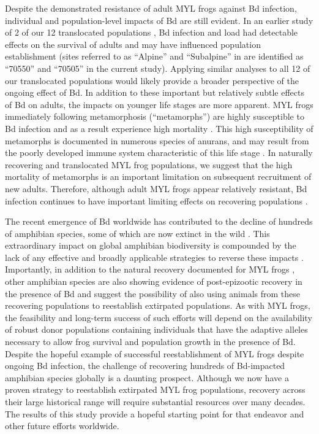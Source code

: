 \documentclass[9pt,twocolumn,twoside,lineno]{pnas-new}
\begin{document}
Despite the demonstrated resistance of adult MYL frogs against Bd
infection, individual and population-level impacts of Bd are still
evident. In an earlier study of 2 of our 12 translocated populations
\citep{joseph2018}, Bd infection and load had detectable effects on the
survival of adults and may have influenced population establishment
(sites referred to as ``Alpine'' and ``Subalpine'' in \citep{joseph2018}
are identified as ``70550'' and ``70505'' in the current study).
Applying similar analyses to all 12 of our translocated populations
would likely provide a broader perspective of the ongoing effect of Bd.
In addition to these important but relatively subtle effects of Bd on
adults, the impacts on younger life stages are more apparent. MYL frogs
immediately following metamorphosis (``metamorphs'') are highly
susceptible to Bd infection \citep{ellison2019} and as a result
experience high mortality \citep{rachowicz2006}. This high
susceptibility of metamorphs is documented in numerous species of
anurans, and may result from the poorly developed immune system
characteristic of this life stage \citep{humphries2022}. In naturally
recovering and translocated MYL frog populations, we suggest that the
high mortality of metamorphs is an important limitation on subsequent
recruitment of new adults. Therefore, although adult MYL frogs appear
relatively resistant, Bd infection continues to have important limiting
effects on recovering populations \citep[see also][]{hollanders2022}.

The recent emergence of Bd worldwide has contributed to the decline of
hundreds of amphibian species, some of which are now extinct in the wild
\citep{scheele2019}. This extraordinary impact on global amphibian
biodiversity is compounded by the lack of any effective and broadly
applicable strategies to reverse these impacts
\citep{garner2016, knapp2022}. Importantly, in addition to the natural
recovery documented for MYL frogs \citep{knapp2016}, other amphibian
species are also showing evidence of post-epizootic recovery in the
presence of Bd \citep{scheele2017, voyles2018} and suggest the
possibility of also using animals from these recovering populations to
reestablish extirpated populations. As with MYL frogs, the feasibility
and long-term success of such efforts will depend on the availability of
robust donor populations containing individuals that have the adaptive
alleles necessary to allow frog survival and population growth in the
presence of Bd. Despite the hopeful example of successful
reestablishment of MYL frogs despite ongoing Bd infection, the challenge
of recovering hundreds of Bd-impacted amphibian species globally is a
daunting prospect. Although we now have a proven strategy to reestablish
extirpated MYL frog populations, recovery across their large historical
range will require substantial resources over many decades. The results
of this study provide a hopeful starting point for that endeavor and
other future efforts worldwide.
\end{document}
